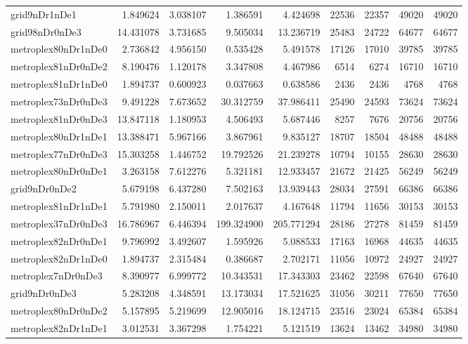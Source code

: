 \begin{longtable}{|l|r|r|r|r|r|r|r|r|}
grid9nDr1nDe1 & 1.849624 & 3.038107 & 1.386591 & 4.424698 & 22536 & 22357 & 49020 & 49020 \\
grid98nDr0nDe3 & 14.431078 & 3.731685 & 9.505034 & 13.236719 & 25483 & 24722 & 64677 & 64677 \\
metroplex80nDr1nDe0 & 2.736842 & 4.956150 & 0.535428 & 5.491578 & 17126 & 17010 & 39785 & 39785 \\
metroplex81nDr0nDe2 & 8.190476 & 1.120178 & 3.347808 & 4.467986 & 6514 & 6274 & 16710 & 16710 \\
metroplex81nDr1nDe0 & 1.894737 & 0.600923 & 0.037663 & 0.638586 & 2436 & 2436 & 4768 & 4768 \\
metroplex73nDr0nDe3 & 9.491228 & 7.673652 & 30.312759 & 37.986411 & 25490 & 24593 & 73624 & 73624 \\
metroplex81nDr0nDe3 & 13.847118 & 1.180953 & 4.506493 & 5.687446 & 8257 & 7676 & 20756 & 20756 \\
metroplex80nDr1nDe1 & 13.388471 & 5.967166 & 3.867961 & 9.835127 & 18707 & 18504 & 48488 & 48488 \\
metroplex77nDr0nDe3 & 15.303258 & 1.446752 & 19.792526 & 21.239278 & 10794 & 10155 & 28630 & 28630 \\
metroplex80nDr0nDe1 & 3.263158 & 7.612276 & 5.321181 & 12.933457 & 21672 & 21425 & 56249 & 56249 \\
grid9nDr0nDe2 & 5.679198 & 6.437280 & 7.502163 & 13.939443 & 28034 & 27591 & 66386 & 66386 \\
metroplex81nDr1nDe1 & 5.791980 & 2.150011 & 2.017637 & 4.167648 & 11794 & 11656 & 30153 & 30153 \\
metroplex37nDr0nDe3 & 16.786967 & 6.446394 & 199.324900 & 205.771294 & 28186 & 27278 & 81459 & 81459 \\
metroplex82nDr0nDe1 & 9.796992 & 3.492607 & 1.595926 & 5.088533 & 17163 & 16968 & 44635 & 44635 \\
metroplex82nDr1nDe0 & 1.894737 & 2.315484 & 0.386687 & 2.702171 & 11056 & 10972 & 24927 & 24927 \\
metroplex7nDr0nDe3 & 8.390977 & 6.999772 & 10.343531 & 17.343303 & 23462 & 22598 & 67640 & 67640 \\
grid9nDr0nDe3 & 5.283208 & 4.348591 & 13.173034 & 17.521625 & 31056 & 30211 & 77650 & 77650 \\
metroplex80nDr0nDe2 & 5.157895 & 5.219699 & 12.905016 & 18.124715 & 23516 & 23024 & 65384 & 65384 \\
metroplex82nDr1nDe1 & 3.012531 & 3.367298 & 1.754221 & 5.121519 & 13624 & 13462 & 34980 & 34980 \\

\end{longtable}
